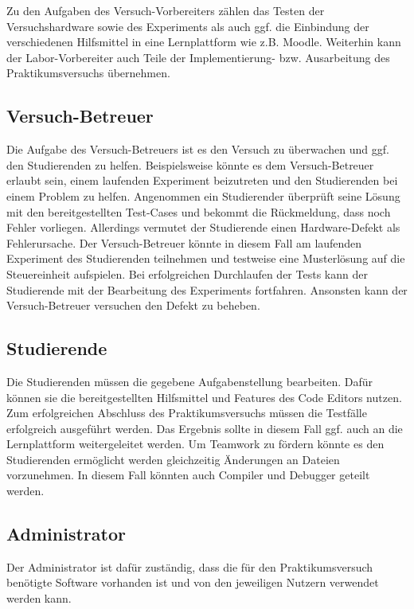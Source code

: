 Zu den Aufgaben des Versuch-Vorbereiters zählen das Testen der Versuchshardware sowie des Experiments als auch ggf. die Einbindung der verschiedenen Hilfsmittel in eine Lernplattform wie z.B. Moodle. Weiterhin kann der Labor-Vorbereiter auch Teile der Implementierung- bzw. Ausarbeitung des Praktikumsversuchs übernehmen.

\subsection{Versuch-Betreuer}

Die Aufgabe des Versuch-Betreuers ist es den Versuch zu überwachen und ggf. den Studierenden zu helfen. Beispielsweise könnte es dem Versuch-Betreuer erlaubt sein, einem laufenden Experiment beizutreten und den Studierenden bei einem Problem zu helfen. Angenommen ein Studierender überprüft seine Lösung mit den bereitgestellten Test-Cases und bekommt die Rückmeldung, dass noch Fehler vorliegen. Allerdings vermutet der Studierende einen Hardware-Defekt als Fehlerursache. Der Versuch-Betreuer könnte in diesem Fall am laufenden Experiment des Studierenden teilnehmen und testweise eine Musterlösung auf die Steuereinheit aufspielen. Bei erfolgreichen Durchlaufen der Tests kann der Studierende mit der Bearbeitung des Experiments fortfahren. Ansonsten kann der Versuch-Betreuer versuchen den Defekt zu beheben.

\subsection{Studierende}

Die Studierenden müssen die gegebene Aufgabenstellung bearbeiten. Dafür können sie die bereitgestellten Hilfsmittel und Features des Code Editors nutzen. Zum erfolgreichen Abschluss des Praktikumsversuchs müssen die Testfälle erfolgreich ausgeführt werden. Das Ergebnis sollte in diesem Fall ggf. auch an die Lernplattform weitergeleitet werden. Um Teamwork zu fördern könnte es den Studierenden ermöglicht werden gleichzeitig Änderungen an Dateien vorzunehmen. In diesem Fall könnten auch Compiler und Debugger geteilt werden.

\subsection{Administrator}

Der Administrator ist dafür zuständig, dass die für den Praktikumsversuch benötigte Software vorhanden ist und von den jeweiligen Nutzern verwendet werden kann.